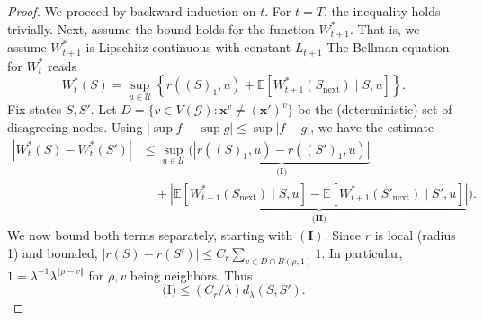 \documentclass{article}
\begin{document}
\begin{proof}
We proceed by backward induction on $t$. For $t=T$,
 the inequality holds trivially.
Next, assume the bound holds for the function $W_{t+1}^*$. That is, we assume $W_{t+1}^*$ is Lipschitz continuous with constant $L_{t+1}$ 
The Bellman equation for $W_t^*$ reads
\[
W_t^*(S) = \sup_{u \in \mathcal{U}} \left\{ r((S)_1, u) + \mathbb{E}[W_{t+1}^*(S_{\mathrm{next}}) \mid S, u] \right\}.
\]
Fix states $S, S'$. Let $D = \{ v \in V(\mathcal G) : \mathbf{x}^v \neq (\mathbf{x}')^v \}$ be the (deterministic) set of disagreeing nodes. Using $|\sup f - \sup g| \le \sup |f - g|$, we have the estimate
\begin{align*}
    |W_t^*(S) - W_t^*(S')| &\le \sup_{u \in \mathcal{U}} \bigg( \underbrace{|r((S)_1, u) - r((S')_1, u)|}_{\textbf{(I)}} \\
    &\quad + \underbrace{\left| \mathbb{E}[W_{t+1}^*(S_{\mathrm{next}}) \mid S, u] - \mathbb{E}[W_{t+1}^*(S'_{\mathrm{next}}) \mid S', u] \right|}_{\textbf{(II)}} \bigg).
\end{align*}
We now bound both terms separately, starting with $\mathbf{(I)}$. Since $r$ is local (radius 1) and bounded, $|r(S) - r(S')| \le C_r \sum_{v \in D \cap B(\rho, 1)} 1$. In particular, $1 = \lambda^{-1} \lambda^{\Vert \rho - v \Vert}$ for $\rho,v$ being neighbors. Thus 
$$\text{(I)} \le (C_r/\lambda) d_{\lambda}(S, S').$$


\end{proof}
\end{document}
